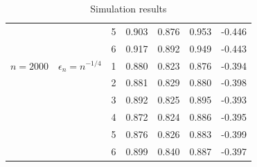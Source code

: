 \documentclass[12pt,oneside,reqno,english]{amsart}
\theoremstyle{definition}
\begin{document}
\begin{table}[H]
\begin{tabular}{ccc|cc|cc}
     & & 5 & 0.903&  0.876 & 0.953 & -0.446  \tabularnewline
     & & 6 & 0.917 & 0.892  & 0.949  & -0.443  \tabularnewline
\hline 
$n=2000$& $\epsilon_{n}=n^{-1/4}$ & 1 & 0.880 & 0.823 & 0.876 & -0.394  \tabularnewline
      & & 2 & 0.881 & 0.829 & 0.880  & -0.398  \tabularnewline
      & & 3 & 0.892 & 0.825 & 0.895 & -0.393  \tabularnewline
      & & 4 & 0.872 & 0.824 & 0.886  & -0.395  \tabularnewline
      & & 5 & 0.876 & 0.826  & 0.883  & -0.399  \tabularnewline
      & & 6 & 0.899 & 0.840  & 0.887  & -0.397  \tabularnewline
\hline 
\hline 
\end{tabular}
\vspace{0.5cm}
\caption{Simulation results}\label{t:sim}
\end{table}


\end{document}
